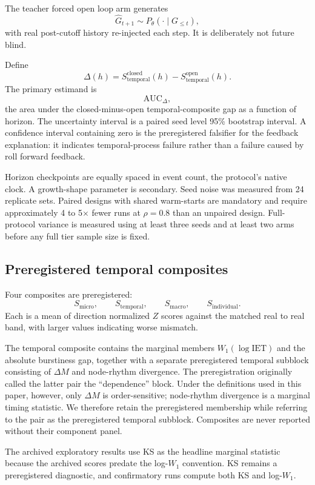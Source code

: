 The teacher forced open loop arm generates
\[
\widehat{G}_{t+1}
\sim
P_\theta\!\left(\cdot\mid G_{\le t}\right),
\]
with real post-cutoff history re-injected each step. It is deliberately not
future blind.

Define
\[
\Delta(h)
=
S_{\mathrm{temporal}}^{\mathrm{closed}}(h)
-
S_{\mathrm{temporal}}^{\mathrm{open}}(h).
\]
The primary estimand is
\[
\mathrm{AUC}_{\Delta},
\]
the area under the closed-minus-open temporal-composite gap as a function of
horizon. The uncertainty interval is a paired seed level 95\% bootstrap
interval. A confidence interval containing zero is the preregistered falsifier
for the feedback explanation: it indicates temporal-process failure rather
than a failure caused by roll forward feedback.

Horizon checkpoints are equally spaced in event count, the protocol's native
clock. A growth-shape parameter is secondary. Seed noise was measured from 24
replicate sets. Paired designs with shared warm-starts are mandatory and
require approximately 4 to 5$\times$ fewer runs at $\rho=0.8$ than an unpaired
design. Full-protocol variance is measured using at least three seeds and at
least two arms before any full tier sample size is fixed.

\subsection{Preregistered temporal composites}

Four composites are preregistered:
\[
S_{\mathrm{micro}},\qquad
S_{\mathrm{temporal}},\qquad
S_{\mathrm{macro}},\qquad
S_{\mathrm{individual}}.
\]
Each is a mean of direction normalized $Z$ scores against the matched
real to real band, with larger values indicating worse mismatch.

The temporal composite contains the marginal members
$W_1(\log \mathrm{IET})$ and the absolute burstiness gap, together with a
separate preregistered temporal subblock consisting of $\Delta M$ and
node-rhythm divergence. The preregistration originally called the latter pair
the ``dependence'' block. Under the definitions used in this paper, however,
only $\Delta M$ is order-sensitive; node-rhythm divergence is a
marginal timing statistic. We therefore retain the preregistered membership
while referring to the pair as the preregistered temporal subblock.
Composites are never reported without their component panel.

The archived exploratory results use KS as the headline marginal statistic
because the archived scores predate the log-$W_1$ convention. KS remains a
preregistered diagnostic, and confirmatory runs compute both KS and log-$W_1$.

